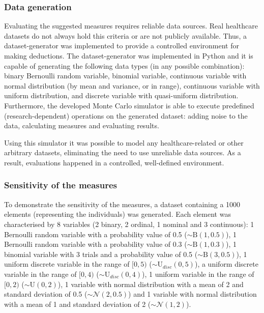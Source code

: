 \subsubsection{Data generation}
\label{subseq:generator}

Evaluating the suggested measures requires reliable data sources. Real healthcare datasets do not always hold this criteria or are not publicly available. Thus, a dataset-generator was implemented to provide a controlled environment for making deductions. The dataset-generator was implemented in Python and it is capable of generating the following data types (in any possible combination): binary Bernoulli random variable, binomial variable, continuous variable with normal distribution (by mean and variance, or in range), continuous variable with uniform distribution, and discrete variable with quasi-uniform distribution. Furthermore, the developed Monte Carlo simulator is able to execute predefined (research-dependent) operations on the generated dataset: adding noise to the data, calculating measures and evaluating results.

Using this simulator it was possible to model any healthcare-related or other arbitrary datasets, eliminating the need to use unreliable data sources. As a result, evaluations happened in a controlled, well-defined environment.

\subsubsection{Sensitivity of the measures}
\label{subseq:noise}

To demonstrate the sensitivity of the measures, a dataset containing a 1000 elements (representing the individuals) was generated. Each element was characterised by 8 variables (2 binary, 2 ordinal, 1 nominal and 3 continuous): 1 Bernoulli random variable with a probability value of 0.5 ($\mathtt{\sim} \textrm{B}(1, 0.5)$), 1 Bernoulli random variable with a probability value of 0.3 ($\mathtt{\sim} \textrm{B}(1, 0.3)$), 1 binomial variable with 3 trials and a probability value of 0.5 ($\mathtt{\sim} \textrm{B}(3, 0.5)$), 1 uniform discrete variable in the range of $[0,5)$ ($\mathtt{\sim} \textrm{U}_{disc}(0, 5)$), a uniform discrete variable in the range of $[0,4)$ ($\mathtt{\sim} \textrm{U}_{disc}(0, 4)$), 1 uniform variable in the range of $[0,2)$ ($\mathtt{\sim} \textrm{U}(0, 2)$), 1 variable with normal distribution with a mean of 2 and standard deviation of 0.5 ($\mathtt{\sim} \mathcal{N}(2, 0.5)$) and 1 variable with normal distribution with a mean of 1 and standard deviation of 2 ($\mathtt{\sim} \mathcal{N}(1, 2)$).
				
